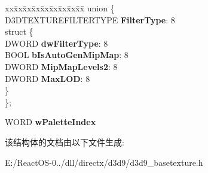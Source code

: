 \begin{DoxyCompactItemize}
\item 
\mbox{\label{struct___direct3_d_base_texture9___i_n_t_a8c60ac3b0e022e22e9d2b59739924a6c}} 
\begin{tabbing}
xx\=xx\=xx\=xx\=xx\=xx\=xx\=xx\=xx\=\kill
union \{\\
\>D3DTEXTUREFILTERTYPE {\bfseries FilterType}: 8\\
\mbox{\label{union___direct3_d_base_texture9___i_n_t_1_1_0D205_aa7fd1a3d3a60a018892e6af62ed45cce}} 
\>struct \{\\
\>\>DWORD {\bfseries dwFilterType}: 8\\
\>\>BOOL {\bfseries bIsAutoGenMipMap}: 8\\
\>\>DWORD {\bfseries MipMapLevels2}: 8\\
\>\>DWORD {\bfseries MaxLOD}: 8\\
\>\} \\
\}; \\

\end{tabbing}\item 
\mbox{\label{struct___direct3_d_base_texture9___i_n_t_aaccde0ddf36c5b5c293aca19caa070f3}} 
W\+O\+RD {\bfseries w\+Palette\+Index}
\end{DoxyCompactItemize}


该结构体的文档由以下文件生成\+:\begin{DoxyCompactItemize}
\item 
E\+:/\+React\+O\+S-\/0../dll/directx/d3d9/d3d9\+\_\+basetexture.\+h\end{DoxyCompactItemize}
